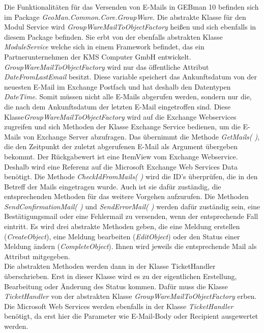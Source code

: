\noindent
Die Funktionalitäten für das Versenden von E-Mails in GEBman 10 befinden sich im Package \textit{GeoMan.Common.Core.GroupWare}. Die abstrakte Klasse für den Modul Service wird \textit{GroupWareMailToObjectFactory} heißen und sich ebenfalls in diesem Package befinden. Sie erbt von der ebenfalls abstrakten Klasse \textit{ModuleService} welche sich in einem Framework befindet, das ein Partnerunternehmen der KMS Computer GmbH entwickelt.\\ 

\noindent
\textit{GroupWareMailToObjectFactory} wird nur das öffentliche Attribut \textit{DateFromLastEmail} besitzt. Diese variable speichert das Ankunftsdatum von der neuesten E-Mail im Exchange Postfach und hat deshalb den Datentypen \textit{DateTime}. Somit müssen nicht alle E-Mails abgerufen werden, sondern nur die, die nach dem Ankunftsdatum der letzten E-Mail eingetroffen sind.\newline
Diese Klasse\textit{GroupWareMailToObjectFactory} wird auf die Exchange Webservices zugreifen und sich Methoden der Klasse Exchange Service bedienen, um die E-Mails von Exchange Server abzufragen. Das übernimmt die Methode \textit{GetMails( )}, die den Zeitpunkt der zuletzt abgerufenen E-Mail als Argument übergeben bekommt. Der Rückgabewert ist eine ItemView vom Exchange Webservice. Deshalb wird eine Referenz auf die Microsoft Exchange Web Services Data benötigt.
\newline 
Die Methode \textit{CheckIdFromMails( )} wird die ID's überprüfen, die in den Betreff der Mails eingetragen wurde. Auch ist sie dafür zuständig, die entsprechenden Methoden für das weitere Vorgehen aufzurufen. Die Methoden \textit{SendConfirmationMail( )} und \textit{SendErrorMail( )} werden dafür zuständig sein, eine Bestätigungsmail oder eine Fehlermail zu versenden, wenn der entsprechende Fall eintritt. Es wird drei abstrakte Methoden geben, die eine Meldung erstellen (\textit{CreateObject}), eine Meldung bearbeiten (\textit{EditObject}) oder den Status einer Meldung ändern (\textit{CompleteObject}). Ihnen wird jeweils die entsprechende Mail als Attribut mitgegeben.\\

\noindent
Die abstrakten Methoden werden dann in der Klasse TicketHandler überschrieben. Erst in dieser Klasse wird es zu der eigentlichen Erstellung, Bearbeitung oder Änderung des Status kommen. Dafür muss die Klasse \textit{TicketHandler} von der abstrakten Klasse \textit{GroupWareMailToObjectFactory} erben. Die Microsoft Web Services werden ebenfalls in der Klasse \textit{TicketHandler} benötigt, da erst hier die Parameter wie E-Mail-Body oder Recipient ausgewertet werden.\\


